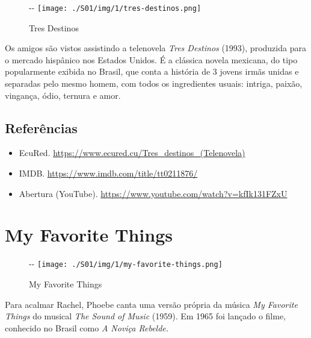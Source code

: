 \begin{figure}[!ht]
  \begin{adjustwidth}{-\oddsidemargin-1in}{-\rightmargin}
    \centering
    \texttt{[image: ./S01/img/1/tres-destinos.png]}
    \caption{Tres Destinos\label{fig:tres-destinos}}
  \end{adjustwidth}
\end{figure}

Os amigos são vistos assistindo a telenovela \emph{Tres Destinos}
(1993), produzida para o mercado hispânico nos Estados Unidos. É a
clássica novela mexicana, do tipo popularmente exibida no Brasil, que
conta a história de 3 jovens irmãs unidas e separadas pelo mesmo homem,
com todos os ingredientes usuais: intriga, paixão, vingança, ódio,
ternura e amor.

\hypertarget{referuxeancias-1}{%
\subsection{Referências}\label{referuxeancias-1}}

\begin{itemize}
\tightlist
\item
  \sloppy EcuRed. \url{https://www.ecured.cu/Tres_destinos_(Telenovela)}
\item
  \sloppy IMDB. \url{https://www.imdb.com/title/tt0211876/}
\item
  \sloppy Abertura (YouTube). \url{https://www.youtube.com/watch?v=kfIk131FZxU}
\end{itemize}

\hypertarget{my-favorite-things}{%
\section{My Favorite Things}\label{my-favorite-things}}

\begin{figure}[!ht]
  \begin{adjustwidth}{-\oddsidemargin-1in}{-\rightmargin}
    \centering
    \texttt{[image: ./S01/img/1/my-favorite-things.png]}
    \caption{My Favorite Things\label{fig:my-favorite-things}}
  \end{adjustwidth}
\end{figure}

Para acalmar Rachel, Phoebe canta uma versão própria da música \emph{My
Favorite Things} do musical \emph{The Sound of Music} (1959). Em 1965
foi lançado o filme, conhecido no Brasil como \emph{A Noviça Rebelde.}

